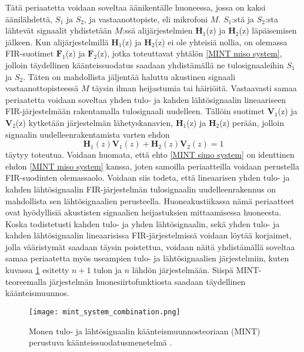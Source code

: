 \documentclass[finnish,12pt]{article}
\begin{document}
Tätä periaatetta voidaan soveltaa äänikentälle huoneessa, jossa on kaksi äänilähdettä, $S_1$ ja $S_2$, ja vastaanottopiste, eli mikrofoni $M$. $S_1$:stä ja $S_2$:sta lähtevät signaalit yhdistetään $M$:ssä alijärjestelmien $\textbf{H}_1$(z) ja $\textbf{H}_2$(z) läpäisemisen jälkeen. Kun alijärjestelmillä $\textbf{H}_1$(z) ja $\textbf{H}_2$(z) ei ole yhteisiä nollia, on olemassa FIR-suotimet $\textbf{F}_1$(z) ja $\textbf{F}_2$(z), jotka toteuttavat yhtälön \eqref{MINT miso system}, jolloin täydellinen käänteissuodatus saadaan yhdistämällä ne tulosignaaleihin $S_1$ ja $S_2$. Täten on mahdollista jäljentää haluttu akustinen signaali vastaanottopisteessä $M$ täysin ilman heijastumia tai häiriöitä. Vastaavasti samaa periaatetta voidaan soveltaa yhden tulo- ja kahden lähtösignaalin lineaariseen FIR-järjestelmään rakentamalla tulosignaali uudelleen. Tällöin suotimet $\textbf{V}_1$(z) ja $\textbf{V}_2$(z) kytketään järjestelmän lähetyskanavien, $\textbf{H}_1$(z) ja $\textbf{H}_2$(z) perään, jolloin signaalin uudelleenrakentamista varten ehdon \begin{equation}
\label{MINT simo system}
\textbf{H}_1(z)\textbf{V}_1(z)+\textbf{H}_2(z)\textbf{V}_2(z) = 1
\end{equation} täytyy toteutua. Voidaan huomata, että ehto \eqref{MINT simo system} on identtinen ehdon \eqref{MINT miso system} kanssa, joten samoilla periaatteilla voidaan perustella FIR-suodinten olemassaolo. Voidaan siis todeta, että lineaarisen yhden tulo- ja kahden lähtösignaalin FIR-järjestelmän tulosignaalin uudelleenrakennus on mahdollista sen lähtösignaalien perusteella. Huoneakustiikassa nämä periaatteet ovat hyödyllisiä akustisten signaalien heijastuksien mittaamisessa huoneesta. Koska todistetusti kahden tulo- ja yhden lähtösignaalin, sekä yhden tulo- ja kahden lähtösignaalin lineaarisissa FIR-järjestelmissä voidaan löytää korjaimet, jolla vääristymät saadaan täysin poistettua, voidaan näitä yhdistämällä soveltaa samaa periaatetta myös useampien tulo- ja lähtösignaalien järjestelmiin, kuten kuvassa \ref{fig:proposed MINT system} esitetty $n+1$ tulon ja $n$ lähdön järjestelmään. Siispä MINT-teoreemalla järjestelmän huonesiirtofunktiosta saadaan täydellinen käänteismuunnos. \cite{MMiyoshi1988}

\begin{figure}[h!]
\centering
\texttt{[image: mint\_system\_combination.png]}
\caption{Monen tulo- ja lähtösignaalin käänteismuunnosteoriaan (MINT) perustuva käänteissuodatusmenetelmä \cite{MMiyoshi1988}.}
\label{fig:proposed MINT system}
\end{figure}
\end{document}
